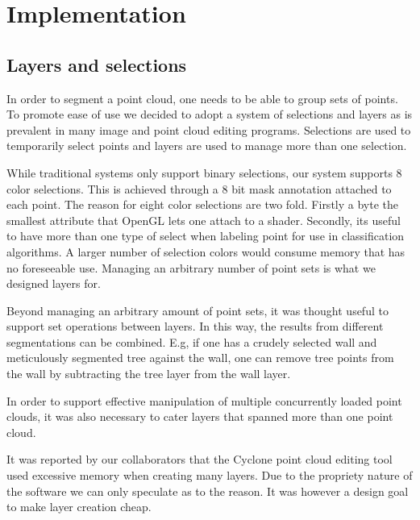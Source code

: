 \chapter{Implementation} \label{ch:implement}



\section{Layers and selections}
In order to segment a point cloud, one needs to be able to group sets of points. To promote ease of use we decided to adopt a system of selections and layers as is prevalent in many image and point cloud editing programs. Selections are used to temporarily select points and layers are used to manage more than one selection.

While traditional systems only support binary selections, our system supports 8 color selections. This is achieved through a 8 bit mask annotation attached to each point. The reason for eight color selections are two fold. Firstly a byte the smallest attribute that OpenGL lets one attach to a shader. Secondly, its useful to have more than one type of select when labeling point for use in classification algorithms. A larger number of selection colors would consume memory that has no foreseeable use. Managing an arbitrary number of point sets is what we designed layers for.

Beyond managing an arbitrary amount of point sets, it was thought useful  to support set operations between layers. In this way, the results from different segmentations can be combined. E.g, if one has a crudely selected wall and meticulously segmented tree against the wall, one can remove tree points from the wall by subtracting the tree layer from the wall layer.

In order to support effective manipulation of multiple concurrently loaded point clouds, it was also necessary to cater layers that spanned more than one point cloud.

It was reported by our collaborators that the Cyclone  point cloud editing tool used excessive memory when creating many layers. Due to the propriety nature of the software we can only speculate as to the reason. It was however a design goal to make layer creation cheap. 

